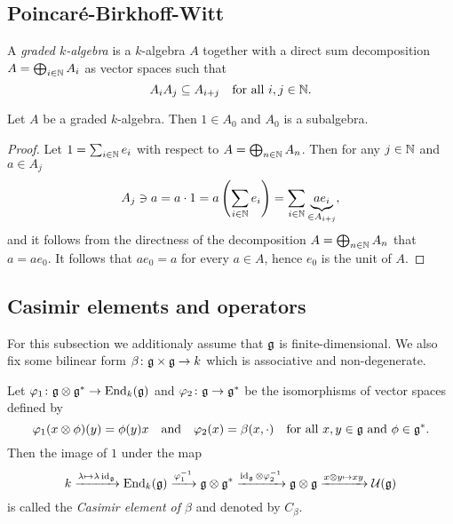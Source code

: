 \subsection{Poincar\'{e}-Birkhoff-Witt}


\begin{defi}
 A \emph{graded $k$-algebra} is a $k$-algebra $A$ together with a direct sum decomposition $A = \bigoplus_{i \in \mathbb{N}} A_i$ as vector spaces such that
 \[
  A_i A_j \subseteq A_{i+j} \quad \text{for all $i,j \in \mathbb{N}$}.
 \]
\end{defi}


\begin{lem}
 Let $A$ be a graded $k$-algebra. Then $1 \in A_0$ and $A_0$ is a subalgebra.
\end{lem}
\begin{proof}
 Let $1 = \sum_{i \in \mathbb{N}} e_i$ with respect to $A = \bigoplus_{n \in \mathbb{N}} A_n$. Then for any $j \in \mathbb{N}$ and $a \in A_j$
 \[
  A_j \ni a
  = a \cdot 1
  = a \left( \sum_{i \in \mathbb{N}} e_i \right)
  = \sum_{i \in \mathbb{N}} \underbrace{a e_i}_{\in A_{i+j}},
 \]
 and it follows from the directness of the decomposition $A = \bigoplus_{n \in \mathbb{N}} A_n$ that $a = a e_0$. It follows that $a e_0 = a$ for every $a \in A$, hence $e_0$ is the unit of $A$.
\end{proof}

















\subsection{Casimir elements and operators}
For this subsection we additionaly assume that $\mathfrak{g}$ is finite-dimensional. We also fix some bilinear form $\beta \colon \mathfrak{g} \times \mathfrak{g} \to k$ which is associative and non-degenerate.


\begin{defi}\label{defi: definition of Casimir element}
 Let $\varphi_1 \colon \mathfrak{g} \otimes \mathfrak{g}^* \to \operatorname{End}_k(\mathfrak{g})$ and $\varphi_2 \colon \mathfrak{g} \to \mathfrak{g}^*$ be the isomorphisms of vector spaces defined by
 \[
  \varphi_1(x \otimes \phi)(y) = \phi(y) x
  \quad\text{and}\quad
  \varphi_2(x) = \beta(x, \cdot)
  \quad\text{for all $x,y \in \mathfrak{g}$ and $\phi \in \mathfrak{g}^*$}.
 \]
 Then the image of $1$ under the map
 \begin{equation}\label{eqn: Casimir without coordinates}
  k
  \xrightarrow{\lambda \mapsto \lambda \operatorname{id}_{\mathfrak{g}}}
  \operatorname{End}_k(\mathfrak{g})
  \xrightarrow{\varphi_1^{-1}}
  \mathfrak{g} \otimes \mathfrak{g}^*
  \xrightarrow{\operatorname{id}_{\mathfrak{g}} \otimes \varphi_2^{-1}}
  \mathfrak{g} \otimes \mathfrak{g}
  \xrightarrow{x \otimes y \mapsto x y}
  \mathcal{U}(\mathfrak{g})
 \end{equation}
 is called the \emph{Casimir element of $\beta$} and denoted by $C_\beta$.
\end{defi}


